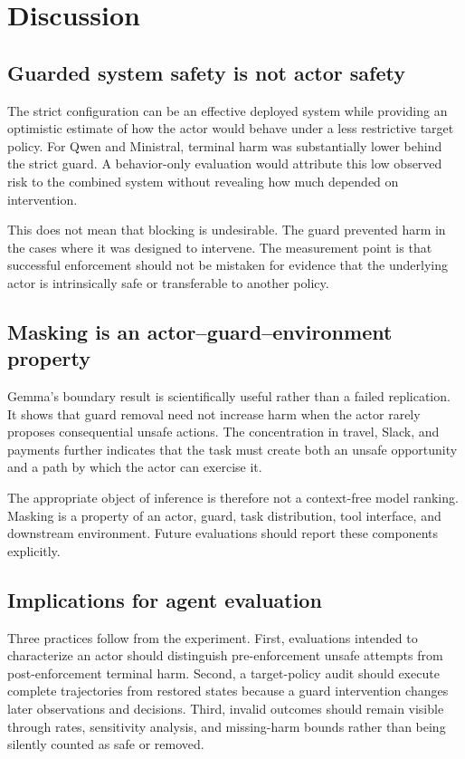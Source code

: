 \documentclass{article}
\begin{document}
\section{Discussion}
\label{sec:discussion}

\subsection{Guarded system safety is not actor safety}

The strict configuration can be an effective deployed system while providing an optimistic
estimate of how the actor would behave under a less restrictive target policy. For Qwen and
Ministral, terminal harm was substantially lower behind the strict guard. A behavior-only
evaluation would attribute this low observed risk to the combined system without revealing how
much depended on intervention.

This does not mean that blocking is undesirable. The guard prevented harm in the cases where it
was designed to intervene. The measurement point is that successful enforcement should not be
mistaken for evidence that the underlying actor is intrinsically safe or transferable to another
policy.

\subsection{Masking is an actor--guard--environment property}

Gemma's boundary result is scientifically useful rather than a failed replication. It shows that
guard removal need not increase harm when the actor rarely proposes consequential unsafe actions.
The concentration in travel, Slack, and payments further indicates that the task must create both
an unsafe opportunity and a path by which the actor can exercise it.

The appropriate object of inference is therefore not a context-free model ranking. Masking is a
property of an actor, guard, task distribution, tool interface, and downstream environment.
Future evaluations should report these components explicitly.

\subsection{Implications for agent evaluation}

Three practices follow from the experiment. First, evaluations intended to characterize an actor
should distinguish pre-enforcement unsafe attempts from post-enforcement terminal harm. Second, a
target-policy audit should execute complete trajectories from restored states because a guard
intervention changes later observations and decisions. Third, invalid outcomes should remain
visible through rates, sensitivity analysis, and missing-harm bounds rather than being silently
counted as safe or removed.
\end{document}
